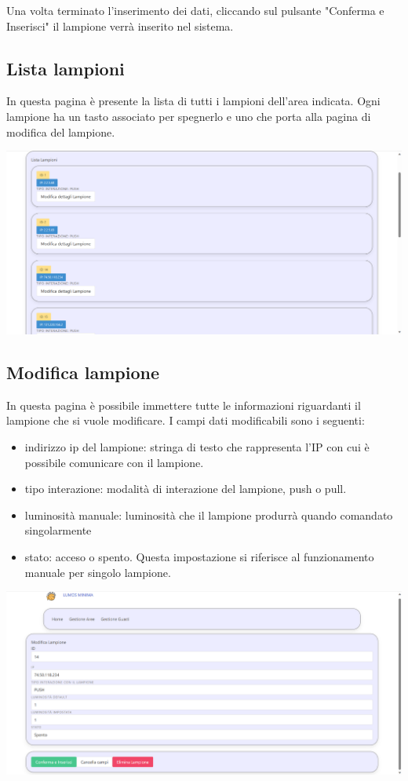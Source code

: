 \documentclass[9pt]{article}
\begin{document}
\begin{itemize}
Una volta terminato l'inserimento dei dati, cliccando sul pulsante "Conferma e Inserisci"
il lampione verrà inserito nel sistema.

\subsection{Lista lampioni}
In questa pagina è presente la lista di tutti i lampioni dell'area indicata.
Ogni lampione ha un tasto associato per spegnerlo e uno che porta alla pagina di modifica del lampione.

\begin{center}
	\includegraphics[scale=0.3]{Lista_lampioni.png}
\end{center}


\subsection{Modifica lampione}
In questa pagina è possibile immettere tutte le informazioni riguardanti il lampione che si vuole modificare.
I campi dati modificabili sono i seguenti:
\begin{itemize}
	\item indirizzo ip del lampione: stringa di testo che rappresenta l'IP con cui è possibile comunicare con il lampione.
	\item tipo interazione: modalità di interazione del lampione, push o pull.
	\item luminosità manuale: luminosità che il lampione produrrà quando comandato singolarmente
	\item stato: acceso o spento. Questa impostazione si riferisce al funzionamento manuale per singolo lampione.
\end{itemize}


\begin{center}
	\includegraphics[scale=0.3]{Modifica_lampione.png}
\end{center}


\end{itemize}
\end{document}
